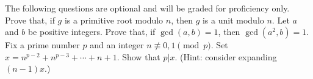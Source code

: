 \documentclass[11pt,addpoints,letterpaper]{exam}
\begin{document}
\begin{questions}
\newpage
The following questions are optional and will be graded for proficiency only. 
\question Prove that, if $g$ is a primitive root modulo $n$, then $g$ is a unit modulo $n$.
 \vfill
 \question Let $a$ and $b$ be positive integers. Prove that,  if $\gcd(a,b)=1$, then $\gcd(a^2,b)=1$. 
 \vfill
\question Fix a prime number $p$ and an integer $n\not\equiv 0,1\pmod{p}$. Set $x=n^{p-2}+n^{p-3}+\cdots+n+1$. Show that $p|x$. (Hint: consider expanding $(n-1)x$.)
\vfill
{}
\end{questions}
\end{document}
